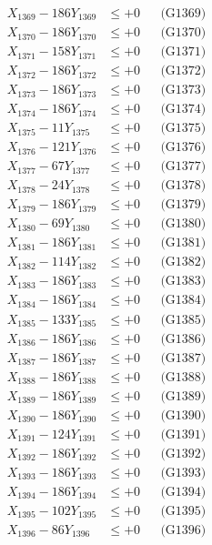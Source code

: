 \documentclass[a4paper,10pt]{article}
\begin{document}
{\begin{align}
X_{1369} - 186Y_{1369} &\leq +0 && \text{(G1369)} \\
X_{1370} - 186Y_{1370} &\leq +0 && \text{(G1370)} \\
\allowbreak
X_{1371} - 158Y_{1371} &\leq +0 && \text{(G1371)} \\
X_{1372} - 186Y_{1372} &\leq +0 && \text{(G1372)} \\
X_{1373} - 186Y_{1373} &\leq +0 && \text{(G1373)} \\
X_{1374} - 186Y_{1374} &\leq +0 && \text{(G1374)} \\
X_{1375} - 11Y_{1375} &\leq +0 && \text{(G1375)} \\
X_{1376} - 121Y_{1376} &\leq +0 && \text{(G1376)} \\
X_{1377} - 67Y_{1377} &\leq +0 && \text{(G1377)} \\
X_{1378} - 24Y_{1378} &\leq +0 && \text{(G1378)} \\
X_{1379} - 186Y_{1379} &\leq +0 && \text{(G1379)} \\
X_{1380} - 69Y_{1380} &\leq +0 && \text{(G1380)} \\
\allowbreak
X_{1381} - 186Y_{1381} &\leq +0 && \text{(G1381)} \\
X_{1382} - 114Y_{1382} &\leq +0 && \text{(G1382)} \\
X_{1383} - 186Y_{1383} &\leq +0 && \text{(G1383)} \\
X_{1384} - 186Y_{1384} &\leq +0 && \text{(G1384)} \\
X_{1385} - 133Y_{1385} &\leq +0 && \text{(G1385)} \\
X_{1386} - 186Y_{1386} &\leq +0 && \text{(G1386)} \\
X_{1387} - 186Y_{1387} &\leq +0 && \text{(G1387)} \\
X_{1388} - 186Y_{1388} &\leq +0 && \text{(G1388)} \\
X_{1389} - 186Y_{1389} &\leq +0 && \text{(G1389)} \\
X_{1390} - 186Y_{1390} &\leq +0 && \text{(G1390)} \\
\allowbreak
X_{1391} - 124Y_{1391} &\leq +0 && \text{(G1391)} \\
X_{1392} - 186Y_{1392} &\leq +0 && \text{(G1392)} \\
X_{1393} - 186Y_{1393} &\leq +0 && \text{(G1393)} \\
X_{1394} - 186Y_{1394} &\leq +0 && \text{(G1394)} \\
X_{1395} - 102Y_{1395} &\leq +0 && \text{(G1395)} \\
X_{1396} - 86Y_{1396} &\leq +0 && \text{(G1396)} \\

\end{align}}
\end{document}
